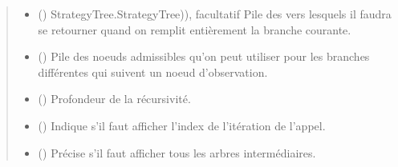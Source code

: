 \documentclass[letterpaper,10pt,french]{sphinxmanual}
\begin{document}
\begin{fulllineitems}
\begin{fulllineitems}
\begin{quote}
\begin{description}
\begin{itemize}
\item {} 
 (\sphinxstyleliteralemphasis{\sphinxupquote{(}}\sphinxstyleliteralemphasis{\sphinxupquote{,}}) \textendash{} StrategyTree.StrategyTree)), facultatif
Pile des  vers lesquels il faudra se retourner quand on
remplit entièrement la branche courante.

\item {} 
 (\sphinxstyleliteralemphasis{\sphinxupquote{(}}\sphinxstyleliteralemphasis{\sphinxupquote{)}}\sphinxstyleliteralemphasis{\sphinxupquote{)}}\sphinxstyleliteralemphasis{\sphinxupquote{, }}) \textendash{} Pile des noeuds admissibles qu’on peut utiliser pour les branches
différentes qui suivent un noeud d’observation.

\item {} 
 (\sphinxstyleliteralemphasis{\sphinxupquote{, }}) \textendash{} Profondeur de la récursivité.

\item {} 
 (\sphinxstyleliteralemphasis{\sphinxupquote{, }}) \textendash{} Indique s’il faut afficher l’index de l’itération de l’appel.

\item {} 
 (\sphinxstyleliteralemphasis{\sphinxupquote{, }}) \textendash{} Précise s’il faut afficher tous les arbres intermédiaires.


\end{itemize}
\end{description}
\end{quote}
\end{fulllineitems}
\end{fulllineitems}
\end{document}
